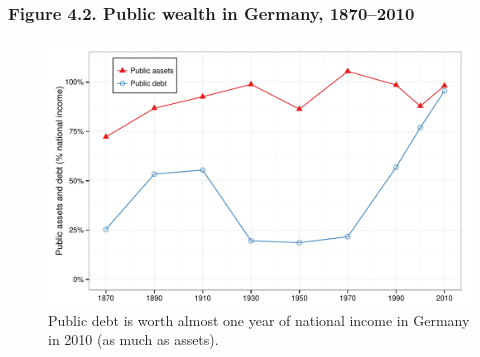 \documentclass[t]{beamer}\usepackage[]{graphicx}\usepackage[]{color}
\newenvironment{knitrout}{}{} %
\begin{document}
\begin{frame}[label=Figure_4_2]
\frametitle{Figure 4.2. Public wealth in Germany, 1870--2010}
\begin{figure}[t]
\begin{minipage}[b]{\textwidth}
\centering
\begin{knitrout}\footnotesize
{}\color{fgcolor}

{\centering \includegraphics[width=1\linewidth]{figures/color/Figure_4_2} 

}



\end{knitrout}
\caption{Public debt is worth almost one year of national income in Germany in 2010 (as much as assets).}
\end{minipage}
\end{figure}
\end{frame}
\end{document}
